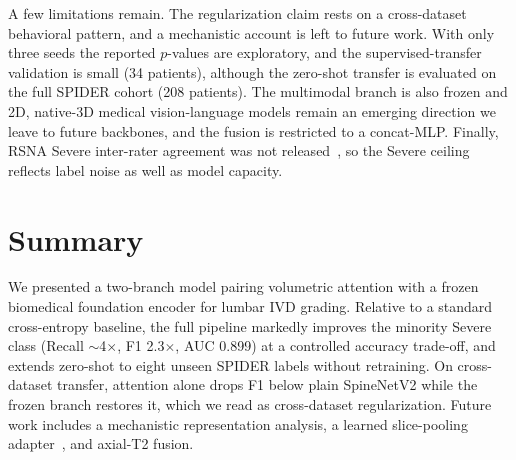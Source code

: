 \documentclass[runningheads]{llncs}
\begin{document}
A few limitations remain. The regularization claim rests on a cross-dataset behavioral pattern, and a mechanistic account is left to future work. With only three seeds the reported $p$-values are exploratory, and the supervised-transfer validation is small (34 patients), although the zero-shot transfer is evaluated on the full SPIDER cohort (208 patients). The multimodal branch is also frozen and 2D, native-3D medical vision-language models remain an emerging direction we leave to future backbones, and the fusion is restricted to a concat-MLP. Finally, RSNA Severe inter-rater agreement was not released~\cite{kaggle2024}, so the Severe ceiling reflects label noise as well as model capacity.

\section{Summary}\label{sec5}

We presented a two-branch model pairing volumetric attention with a frozen biomedical foundation encoder for lumbar IVD grading. Relative to a standard cross-entropy baseline, the full pipeline markedly improves the minority Severe class (Recall $\sim$4$\times$, F1 2.3$\times$, AUC 0.899) at a controlled accuracy trade-off, and extends zero-shot to eight unseen SPIDER labels without retraining. On cross-dataset transfer, attention alone drops F1 below plain SpineNetV2 while the frozen branch restores it, which we read as cross-dataset regularization. Future work includes a mechanistic representation analysis, a learned slice-pooling adapter~\cite{lu2024radclip}, and axial-T2 fusion.

%


\end{document}
